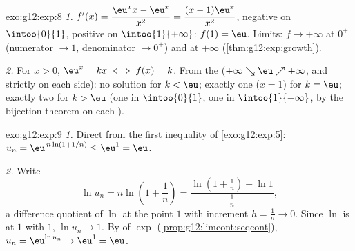 \begin{solution}{exo:g12:exp:8}
\emph{1.} $f'(x) = \dfrac{\eu^x x - \eu^x}{x^2} = \dfrac{(x-1)\eu^x}{x^2}$,
negative on $\intoo{0}{1}$, positive on $\intoo{1}{+\infty}$: 
$f(1) = \eu$. Limits: $f \to +\infty$ at $0^+$ (numerator $\to 1$,
denominator $\to 0^+$) and at $+\infty$ (\cref{thm:g12:exp:growth}).

\emph{2.} For $x > 0$, $\eu^x = kx \iff f(x) = k$. From the 
($+\infty \searrow \eu \nearrow +\infty$,  and strictly 
on each side): no solution for $k < \eu$; exactly one ($x = 1$) for
$k = \eu$; exactly two for $k > \eu$ (one in $\intoo{0}{1}$, one in
$\intoo{1}{+\infty}$, by the bijection theorem on each ).
\end{solution}

\begin{solution}{exo:g12:exp:9}
\emph{1.} Direct from the first inequality of \cref{exo:g12:exp:5}:
$u_n = \eu^{\,n\ln(1+1/n)} \leq \eu^1 = \eu$.

\emph{2.} Write
\[
\ln u_n = n \ln\!\left(1 + \frac1n\right)
= \frac{\ln\!\left(1 + \frac1n\right) - \ln 1}{\frac1n},
\]
a difference quotient of $\ln$ at the point $1$ with increment
$h = \frac1n \to 0$. Since $\ln$ is  at $1$ with 
$1$, $\ln u_n \to 1$. By  of $\exp$
(\cref{prop:g12:limcont:seqcont}), $u_n = \eu^{\ln u_n} \to \eu^1 = \eu$.
\end{solution}

